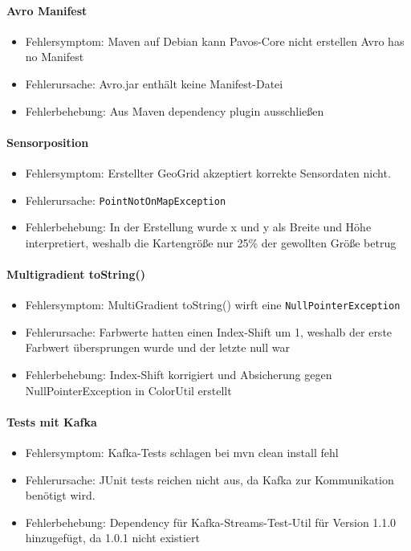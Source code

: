 \paragraph{Avro Manifest}
\begin{itemize}
	\item Fehlersymptom: Maven auf Debian kann Pavos-Core nicht erstellen
	Avro has no Manifest
	\item Fehlerursache: Avro.jar enthält keine Manifest-Datei
	\item Fehlerbehebung: Aus Maven dependency plugin ausschließen
\end{itemize}

\paragraph{Sensorposition}
\begin{itemize}
	\item Fehlersymptom: Erstellter GeoGrid akzeptiert korrekte Sensordaten nicht.
	\item Fehlerursache: \texttt{PointNotOnMapException}
	\item Fehlerbehebung: In der Erstellung wurde x und y als Breite und Höhe interpretiert, weshalb die Kartengröße nur 25\% der gewollten Größe betrug
\end{itemize}

\paragraph{Multigradient toString()}
\begin{itemize}
	\item Fehlersymptom: MultiGradient toString() wirft eine \texttt{NullPointerException}
	\item Fehlerursache: Farbwerte hatten einen Index-Shift um 1, weshalb der erste Farbwert übersprungen wurde und der letzte null war
	\item Fehlerbehebung: Index-Shift korrigiert und Absicherung gegen NullPointerException in ColorUtil erstellt
\end{itemize}

\paragraph{Tests mit Kafka}
\begin{itemize}
	\item Fehlersymptom: Kafka-Tests schlagen bei mvn clean install fehl
	\item Fehlerursache: JUnit tests reichen nicht aus, da Kafka zur Kommunikation benötigt wird.
	\item Fehlerbehebung: Dependency für Kafka-Streams-Test-Util für Version 1.1.0 hinzugefügt, da 1.0.1 nicht existiert
\end{itemize}

